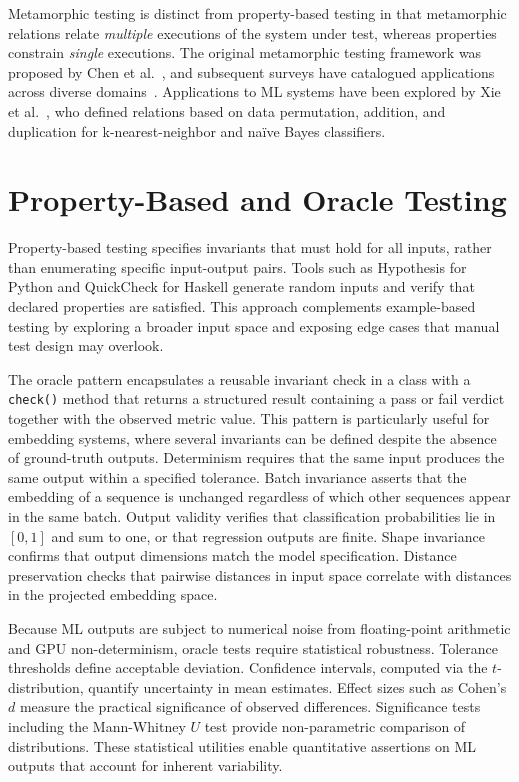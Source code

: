 Metamorphic testing is distinct from property-based testing in that metamorphic relations relate \emph{multiple} executions of the system under test, whereas properties constrain \emph{single} executions. The original metamorphic testing framework was proposed by Chen et al.~\cite{chen1998metamorphic}, and subsequent surveys have catalogued applications across diverse domains~\cite{segura2016survey}. Applications to \ac{ML} systems have been explored by Xie et al.~\cite{xie2011testing}, who defined relations based on data permutation, addition, and duplication for k-nearest-neighbor and na\"ive Bayes classifiers.

\section{Property-Based and Oracle Testing}\label{sec:oracle-testing}

Property-based testing specifies invariants that must hold for all inputs, rather than enumerating specific input-output pairs. Tools such as Hypothesis for Python and QuickCheck for Haskell generate random inputs and verify that declared properties are satisfied. This approach complements example-based testing by exploring a broader input space and exposing edge cases that manual test design may overlook.

The oracle pattern encapsulates a reusable invariant check in a class with a \texttt{check()} method that returns a structured result containing a pass or fail verdict together with the observed metric value. This pattern is particularly useful for embedding systems, where several invariants can be defined despite the absence of ground-truth outputs. Determinism requires that the same input produces the same output within a specified tolerance. Batch invariance asserts that the embedding of a sequence is unchanged regardless of which other sequences appear in the same batch. Output validity verifies that classification probabilities lie in $[0, 1]$ and sum to one, or that regression outputs are finite. Shape invariance confirms that output dimensions match the model specification. Distance preservation checks that pairwise distances in input space correlate with distances in the projected embedding space.

Because \ac{ML} outputs are subject to numerical noise from floating-point arithmetic and \ac{GPU} non-determinism, oracle tests require statistical robustness. Tolerance thresholds define acceptable deviation. Confidence intervals, computed via the $t$-distribution, quantify uncertainty in mean estimates. Effect sizes such as Cohen's $d$ measure the practical significance of observed differences. Significance tests including the Mann-Whitney $U$ test provide non-parametric comparison of distributions. These statistical utilities enable quantitative assertions on \ac{ML} outputs that account for inherent variability.

